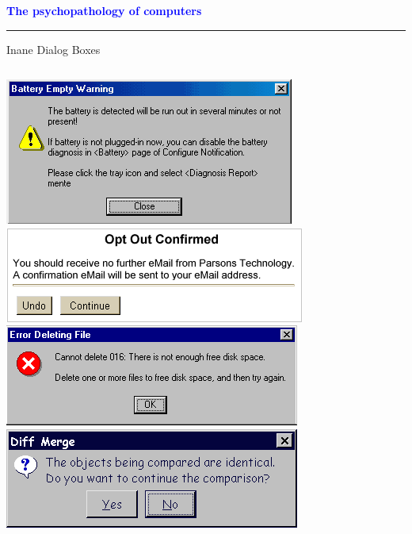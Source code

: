 \documentclass[pdf]{beamer}
\begin{document}
\begin{frame}
    \textcolor{Blue}{\textbf{\Large{The psychopathology of computers}}}
    \textcolor{red}{\rule{10cm}{1mm}}
    
{\LARGE{{Inane Dialog Boxes}}}
\newline

\vspace{5mm}

\begin{columns}[t]

	\vspace{-1cm}
	\includegraphics[scale=0.5]{35_battery.png} 
	\vspace{2mm}
	\includegraphics[scale=0.5]{35_optout.png}
	\vspace{2mm}
	\includegraphics[scale=0.5]{35_error.png}
    \hspace{-8mm}
	\vspace{-1cm}
	\includegraphics[scale=0.5]{35_diff.png}

\end{columns}
\end{frame}
\end{document}
